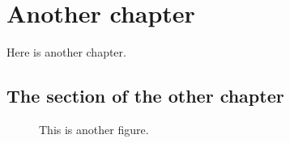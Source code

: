 \chapter{Another chapter}

Here is another chapter.

\section{The section of the other chapter}

\begin{figure}
	\caption{This is another figure.}
\end{figure}